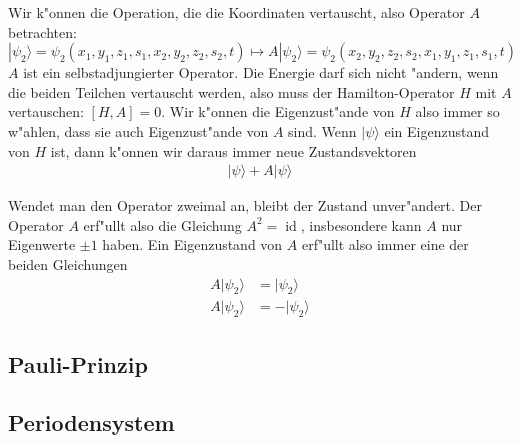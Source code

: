 Wir k"onnen die Operation, die die Koordinaten vertauscht, also
Operator $A$ betrachten:
\[
|\psi_2\rangle
=
\psi_2(x_1,y_1,z_1,s_1,x_2,y_2,z_2,s_2,t)
\mapsto
A|\psi_2\rangle
=
\psi_2(x_2,y_2,z_2,s_2,x_1,y_1,z_1,s_1,t)
\]
$A$ ist ein selbstadjungierter Operator.
Die Energie darf sich nicht "andern, wenn die beiden Teilchen vertauscht
werden, also muss der Hamilton-Operator $H$ mit $A$ vertauschen:
$[H,A]=0$. Wir k"onnen die Eigenzust"ande von $H$ also immer so
w"ahlen, dass sie auch Eigenzust"ande von $A$ sind.
Wenn $|\psi\rangle$ ein Eigenzustand von $H$ ist, dann k"onnen wir
daraus immer neue Zustandsvektoren
\begin{align*}
|\psi\rangle + A|\psi\rangle
\end{align*}

Wendet man den Operator zweimal an, bleibt der Zustand unver"andert.
Der Operator $A$ erf"ullt also die Gleichung $A^2=\operatorname{id}$,
insbesondere kann $A$ nur Eigenwerte $\pm 1$ haben.
Ein Eigenzustand von $A$ erf"ullt also immer eine der beiden 
Gleichungen
\begin{align*}
A|\psi_2\rangle &= |\psi_2\rangle
\tag{symmetrisch}
\\
A|\psi_2\rangle &=-|\psi_2\rangle
\tag{antisymmetrisch}
\end{align*}

\subsection{Pauli-Prinzip}

\subsection{Periodensystem}



